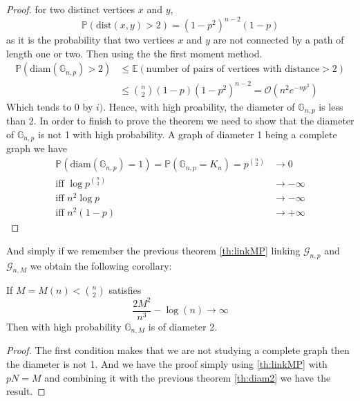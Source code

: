 \begin{proof}
	for two distinct vertices $x$ and $y$,
	\begin{equation}
		\mathbb{P}(\text{dist}(x, y) > 2) = (1-p^2)^{n-2}(1-p)
	\end{equation}
	as it is the probability that two vertices $x$ and $y$ are not connected by a path of length one or two.
	\newline
	Then using the the first moment method.
	\begin{align}
		\mathbb{P}(\text{diam}(\mathbb{G}_{n,p}) > 2) 	&\leq \mathbb{E}(\text{number of pairs of vertices with distance} > 2) \\
	&\leq \binom{n}{2}(1-p)(1-p^2)^{n-2} = \mathcal{O}(n^2e^{-np^2})
	\end{align}
	Which tends to 0 by $i)$. Hence, with high proability, the diameter of $\mathbb{G}_{n,p}$ is less than 2. 
	In order to finish to prove the theorem we need to show that the diameter of $\mathbb{G}_{n,p}$ is not 1 with high probability.
	A graph of diameter 1 being a complete graph we have
	\begin{align}
		\mathbb{P}(\text{diam}(\mathbb{G}_{n,p}) = 1) = \mathbb{P}(\mathbb{G}_{n,p} = K_n) 	
				= p^{\binom{n}{2}} &\longrightarrow 0				\\
		\text{iff  } \log p^{\binom{n}{2}} &\longrightarrow -\infty			\\
			   \text{iff  } n^2 \log p &\longrightarrow -\infty			\\
	\text{iff  } n^2 (1-p) &\longrightarrow +\infty			
	\end{align}	
\end{proof}
And simply if we remember the previous theorem \eqref{th:linkMP} linking $\mathcal{G}_{n,p}$ and $\mathcal{G}_{n,M}$ we obtain the following corollary:
\begin{corollary}
	If $M=M(n) < \binom{n}{2}$ satisfies 
	\begin{equation}
		\frac{2M^2}{n^3} - \log(n) \longrightarrow \infty
	\end{equation}
	Then with high probability $\mathbb{G}_{n, M}$ is of diameter 2.
\end{corollary}
\begin{proof}
	The first condition makes that we are not studying a complete graph then the diameter is not 1.
	And we have the proof simply using \eqref{th:linkMP} with $pN = M$ and combining it with the previous theorem \eqref{th:diam2} we have the result.
\end{proof}

